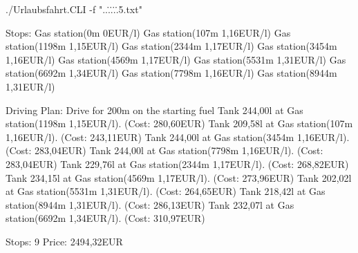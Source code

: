 \documentclass[a4paper,10pt,ngerman]{scrartcl}
\begin{document}
\begin{lstcs}
./Urlaubsfahrt.CLI -f "..\..\..\..\..\examples\fahrt5.txt"

Stops:
  Gas station(0m 0EUR/l)
  Gas station(107m 1,16EUR/l)
  Gas station(1198m 1,15EUR/l)
  Gas station(2344m 1,17EUR/l)
  Gas station(3454m 1,16EUR/l)
  Gas station(4569m 1,17EUR/l)
  Gas station(5531m 1,31EUR/l)
  Gas station(6692m 1,34EUR/l)
  Gas station(7798m 1,16EUR/l)
  Gas station(8944m 1,31EUR/l)

Driving Plan:
  Drive for 200m on the starting fuel
  Tank 244,00l at Gas station(1198m 1,15EUR/l). (Cost: 280,60EUR)
  Tank 209,58l at Gas station(107m 1,16EUR/l). (Cost: 243,11EUR)
  Tank 244,00l at Gas station(3454m 1,16EUR/l). (Cost: 283,04EUR)
  Tank 244,00l at Gas station(7798m 1,16EUR/l). (Cost: 283,04EUR)
  Tank 229,76l at Gas station(2344m 1,17EUR/l). (Cost: 268,82EUR)
  Tank 234,15l at Gas station(4569m 1,17EUR/l). (Cost: 273,96EUR)
  Tank 202,02l at Gas station(5531m 1,31EUR/l). (Cost: 264,65EUR)
  Tank 218,42l at Gas station(8944m 1,31EUR/l). (Cost: 286,13EUR)
  Tank 232,07l at Gas station(6692m 1,34EUR/l). (Cost: 310,97EUR)

  Stops: 9
  Price: 2494,32EUR
\end{lstcs}
\end{document}
